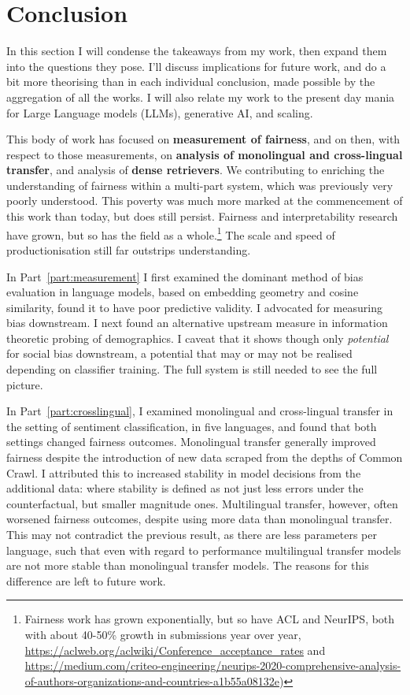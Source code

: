 \chapter{Conclusion}\label{chapter:conclusion}

In this section I will condense the takeaways from my work, then expand them into the questions they pose. I'll discuss implications for future work, and do a bit more theorising than in each individual conclusion, made possible by the aggregation of all the works. I will also relate my work to the present day mania for Large Language models (LLMs), generative AI, and scaling.

This body of work has focused on \textbf{measurement of fairness}, and on then, with respect to those measurements, on \textbf{analysis of monolingual and cross-lingual transfer}, and analysis of \textbf{dense retrievers}. We contributing to enriching the understanding of fairness within a multi-part system, which was previously very poorly understood. This poverty was much more marked at the commencement of this work than today, but does still persist. Fairness and interpretability research have grown, but so has the field as a whole.\footnote{Fairness work has grown exponentially, but so have ACL and NeurIPS, both with about 40-50\% growth in submissions year over year, \url{https://aclweb.org/aclwiki/Conference_acceptance_rates} and \url{https://medium.com/criteo-engineering/neurips-2020-comprehensive-analysis-of-authors-organizations-and-countries-a1b55a08132e})} The scale and speed of productionisation still far outstrips understanding. 

In Part~\ref{part:measurement} I first examined the dominant method of bias evaluation in language models, based on embedding geometry and cosine similarity, found it to have poor predictive validity. I advocated for measuring bias downstream. 
I next found an alternative upstream measure in information theoretic probing of demographics. I caveat that it shows though only \textit{potential} for social bias downstream, a potential that may or may not be realised depending on classifier training. The full system is still needed to see the full picture.

In Part~\ref{part:crosslingual}, I examined monolingual and cross-lingual transfer in the setting of sentiment classification, in five languages, and found that both settings changed fairness outcomes. Monolingual transfer generally improved fairness despite the introduction of new data scraped from the depths of Common Crawl. I attributed this to increased stability in model decisions from the additional data: where stability is defined as not just less errors under the counterfactual, but smaller magnitude ones. Multilingual transfer, however, often worsened fairness outcomes, despite using more data than monolingual transfer. This may not contradict the previous result, as there are less parameters per language, such that even with regard to performance multilingual transfer models are not more stable than monolingual transfer models. The reasons for this difference are left to future work. 

